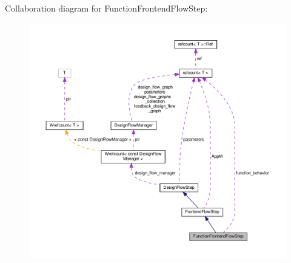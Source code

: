 Collaboration diagram for Function\+Frontend\+Flow\+Step\+:
\nopagebreak
\begin{figure}[H]
\begin{center}
\leavevmode
\includegraphics[width=350pt]{d0/d39/classFunctionFrontendFlowStep__coll__graph}
\end{center}
\end{figure}
